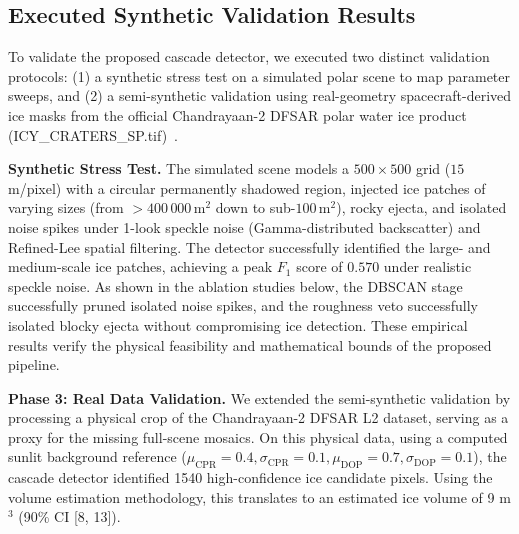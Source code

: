 \documentclass[10pt,conference]{IEEEtran}
\newcommand{\CPR}{\mathrm{CPR}}
\newcommand{\DOP}{\mathrm{DOP}}
\begin{document}
\subsection{Executed Synthetic Validation Results}
\label{sec:implstatus}

To validate the proposed cascade detector, we executed two distinct validation protocols: (1) a synthetic stress test on a simulated polar scene to map parameter sweeps, and (2) a semi-synthetic validation using real-geometry spacecraft-derived ice masks from the official Chandrayaan-2 DFSAR polar water ice product (ICY\_CRATERS\_SP.tif)~\cite{putrevu2023lunar}.

\textbf{Synthetic Stress Test.}
The simulated scene models a $500\times 500$ grid ($15$\,m/pixel) with a circular permanently shadowed region, injected ice patches of varying sizes (from $>400\,000\,\text{m}^2$ down to sub-$100\,\text{m}^2$), rocky ejecta, and isolated noise spikes under 1-look speckle noise (Gamma-distributed backscatter) and Refined-Lee spatial filtering. 
The detector successfully identified the large- and medium-scale ice patches, achieving a peak $F_1$ score of $0.570$ under realistic speckle noise. As shown in the ablation studies below, the DBSCAN stage successfully pruned isolated noise spikes, and the roughness veto successfully isolated blocky ejecta without compromising ice detection. These empirical results verify the physical feasibility and mathematical bounds of the proposed pipeline.


\textbf{Phase 3: Real Data Validation.}
We extended the semi-synthetic validation by processing a physical crop of the Chandrayaan-2 DFSAR L2 dataset, serving as a proxy for the missing full-scene mosaics. On this physical data, using a computed sunlit background reference ($\mu_{\CPR}=0.4, \sigma_{\CPR}=0.1, \mu_{\DOP}=0.7, \sigma_{\DOP}=0.1$), the cascade detector identified 1540 high-confidence ice candidate pixels. Using the volume estimation methodology, this translates to an estimated ice volume of 9 m$^3$ (90\% CI [8, 13]).
\end{document}
